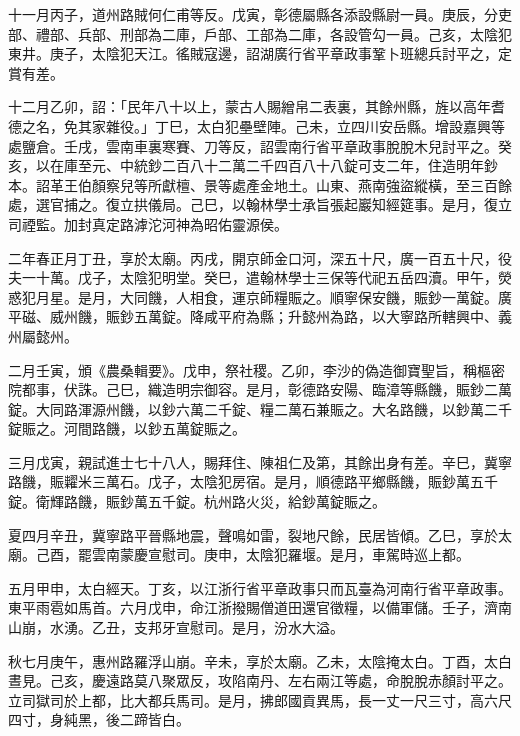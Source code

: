 \begin{pinyinscope}
 十一月丙子，道州路賊何仁甫等反。戊寅，彰德屬縣各添設縣尉一員。庚辰，分吏部、禮部、兵部、刑部為二庫，戶部、工部為二庫，各設管勾一員。己亥，太陰犯東井。庚子，太陰犯天江。徭賊寇邊，詔湖廣行省平章政事鞏卜班總兵討平之，定賞有差。



 十二月乙卯，詔：「民年八十以上，蒙古人賜繒帛二表裏，其餘州縣，旌以高年耆德之名，免其家雜役。」丁巳，太白犯壘壁陣。己未，立四川安岳縣。增設嘉興等處鹽倉。壬戌，雲南車裏寒賽、刀等反，詔雲南行省平章政事脫脫木兒討平之。癸亥，以在庫至元、中統鈔二百八十二萬二千四百八十八錠可支二年，住造明年鈔本。詔革王伯顏察兒等所獻檀、景等處產金地土。山東、燕南強盜縱橫，至三百餘處，選官捕之。復立拱儀局。己巳，以翰林學士承旨張起巖知經筵事。是月，復立司禋監。加封真定路滹沱河神為昭佑靈源侯。



 二年春正月丁丑，享於太廟。丙戌，開京師金口河，深五十尺，廣一百五十尺，役夫一十萬。戊子，太陰犯明堂。癸巳，遣翰林學士三保等代祀五岳四瀆。甲午，熒惑犯月星。是月，大同饑，人相食，運京師糧賑之。順寧保安饑，賑鈔一萬錠。廣平磁、威州饑，賑鈔五萬錠。降咸平府為縣；升懿州為路，以大寧路所轄興中、義州屬懿州。



 二月壬寅，頒《農桑輯要》。戊申，祭社稷。乙卯，李沙的偽造御寶聖旨，稱樞密院都事，伏誅。己巳，織造明宗御容。是月，彰德路安陽、臨漳等縣饑，賑鈔二萬錠。大同路渾源州饑，以鈔六萬二千錠、糧二萬石兼賑之。大名路饑，以鈔萬二千錠賑之。河間路饑，以鈔五萬錠賑之。



 三月戊寅，親試進士七十八人，賜拜住、陳祖仁及第，其餘出身有差。辛巳，冀寧路饑，賑糶米三萬石。戊子，太陰犯房宿。是月，順德路平鄉縣饑，賑鈔萬五千錠。衛輝路饑，賑鈔萬五千錠。杭州路火災，給鈔萬錠賑之。



 夏四月辛丑，冀寧路平晉縣地震，聲鳴如雷，裂地尺餘，民居皆傾。乙巳，享於太廟。己酉，罷雲南蒙慶宣慰司。庚申，太陰犯羅堰。是月，車駕時巡上都。



 五月甲申，太白經天。丁亥，以江浙行省平章政事只而瓦臺為河南行省平章政事。東平雨雹如馬首。六月戊申，命江浙撥賜僧道田還官徵糧，以備軍儲。壬子，濟南山崩，水湧。乙丑，支邦牙宣慰司。是月，汾水大溢。



 秋七月庚午，惠州路羅浮山崩。辛未，享於太廟。乙未，太陰掩太白。丁酉，太白晝見。己亥，慶遠路莫八聚眾反，攻陷南丹、左右兩江等處，命脫脫赤顏討平之。立司獄司於上都，比大都兵馬司。是月，拂郎國貢異馬，長一丈一尺三寸，高六尺四寸，身純黑，後二蹄皆白。




\end{pinyinscope}
